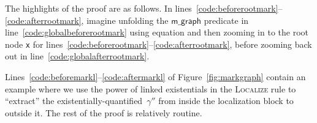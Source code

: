 \documentclass[acmsmall,screen]{acmart}  %
\newcommand{\li}[1]{{\texttt{\small #1}}} %
\newcommand\hide[1]{}
\newcommand{\p}[1]{\ensuremath{\mathsf{#1}}} \newcommand{\m}[1]{\ensuremath{\mathit{#1}}} \newcommand{\ma}[1]{\ensuremath{\mathcal{#1}}} \let\ramify\lightning
\newcommand{\infrulestyle}[1]{\textsc{#1}}
\providecommand{\DIFadd}[1]{{\protect\color{blue}\uwave{#1}}} %
\providecommand{\DIFaddbegin}{} %
\providecommand{\DIFaddend}{} %
\providecommand{\DIFdelbegin}{} %
\providecommand{\DIFdelend}{} %
\newcommand{\DIFscaledelfig}{0.5}
\newlength{\DIFdelgraphicswidth} %
\newlength{\DIFdelgraphicsheight} %
\newcommand{\DIFaddincludegraphics}[2][]{{\color{blue}\fbox{\DIFOincludegraphics[#1]{#2}}}} %
\newcommand{\DIFdelincludegraphics}[2][]{%
\sbox{\DIFdelgraphicsbox}{\DIFOincludegraphics[#1]{#2}}%
\settoboxwidth{\DIFdelgraphicswidth}{\DIFdelgraphicsbox} %
\settoboxtotalheight{\DIFdelgraphicsheight}{\DIFdelgraphicsbox} %
\scalebox{\DIFscaledelfig}{%
\parbox[b]{\DIFdelgraphicswidth}{\usebox{\DIFdelgraphicsbox}\\[-\baselineskip] \rule{\DIFdelgraphicswidth}{0em}}\llap{\resizebox{\DIFdelgraphicswidth}{\DIFdelgraphicsheight}{%
\setlength{\unitlength}{\DIFdelgraphicswidth}%
\begin{picture}(1,1)%
\thicklines\linethickness{2pt} %
{\color[rgb]{1,0,0}\put(0,0){\framebox(1,1){}}}%
{\color[rgb]{1,0,0}\put(0,0){\line( 1,1){1}}}%
{\color[rgb]{1,0,0}\put(0,1){\line(1,-1){1}}}%
\end{picture}%
}\hspace*{3pt}}} %
} %
\DeclareRobustCommand{\DIFaddbegin}{\DIFOaddbegin \let\includegraphics\DIFaddincludegraphics} %
\DeclareRobustCommand{\DIFaddend}{\DIFOaddend \let\includegraphics\DIFOincludegraphics} %
\DeclareRobustCommand{\DIFdelbegin}{\DIFOdelbegin \let\includegraphics\DIFdelincludegraphics} %
\DeclareRobustCommand{\DIFdelend}{\DIFOaddend \let\includegraphics\DIFOincludegraphics} %
\begin{document}
The highlights of the proof are as follows.
In lines~\ref{code:beforerootmark}--\ref{code:afterrootmark}, imagine unfolding the \DIFdelbegin %
\DIFdelend \DIFaddbegin \p{m\_graph} \DIFaddend predicate in line~\ref{code:globalbeforerootmark} using equation \DIFdelbegin %
\DIFdelend \DIFaddbegin \DIFadd{\ref{eqn:bigraphintrofoldunfold} }\DIFaddend and then zooming in to the root node \li{x} for lines~\ref{code:beforerootmark}--\ref{code:afterrootmark}, before zooming back out in line~\ref{code:globalafterrootmark}.
\hide{\color{magenta}Here we upgrade the \infrulestyle{Ramify} rule in two important respects.  The first is the treatment of modified program variables.  Although prosaic, a robust treatment of modified variables is essential to verifying programs of any length.  The second is better handling of existential variables in the postconditions of localization blocks, which occur frequently when using relations in specifications.}
Lines~\ref{code:beforemarkl}--\ref{code:aftermarkl} of Figure~\ref{fig:markgraph} contain an example where we use the power of linked existentials in the \textsc{Localize} rule to ``extract'' the existentially-quantified~$\gamma''$ from inside the localization block to outside it.
The rest of the proof is relatively routine.



\DIFdelbegin %
\end{document}

